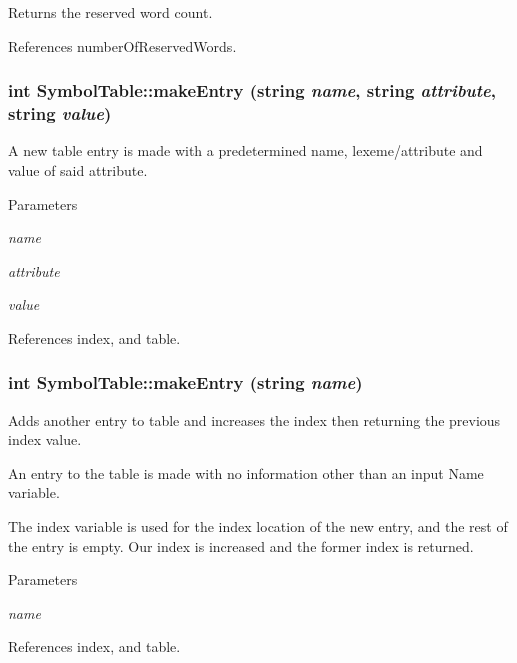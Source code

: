 Returns the reserved word count. 



References numberOfReservedWords.

\hypertarget{classSymbolTable_a064e30f7ddbd4065244d1d41ea885737}{
\subsubsection[{makeEntry}]{\setlength{\rightskip}{0pt plus 5cm}int SymbolTable::makeEntry (string {\em name}, \/  string {\em attribute}, \/  string {\em value})}}
\label{classSymbolTable_a064e30f7ddbd4065244d1d41ea885737}


A new table entry is made with a predetermined name, lexeme/attribute and value of said attribute. 


\begin{DoxyParams}{Parameters}
\item[{\em name}]\item[{\em attribute}]\item[{\em value}]\end{DoxyParams}


References index, and table.

\hypertarget{classSymbolTable_a1df7dfc3592c924e8c8a9fea1e13bf89}{
\subsubsection[{makeEntry}]{\setlength{\rightskip}{0pt plus 5cm}int SymbolTable::makeEntry (string {\em name})}}
\label{classSymbolTable_a1df7dfc3592c924e8c8a9fea1e13bf89}


Adds another entry to table and increases the index then returning the previous index value. 

An entry to the table is made with no information other than an input Name variable.

The index variable is used for the index location of the new entry, and the rest of the entry is empty. Our index is increased and the former index is returned. 
\begin{DoxyParams}{Parameters}
\item[{\em name}]\end{DoxyParams}


References index, and table.



